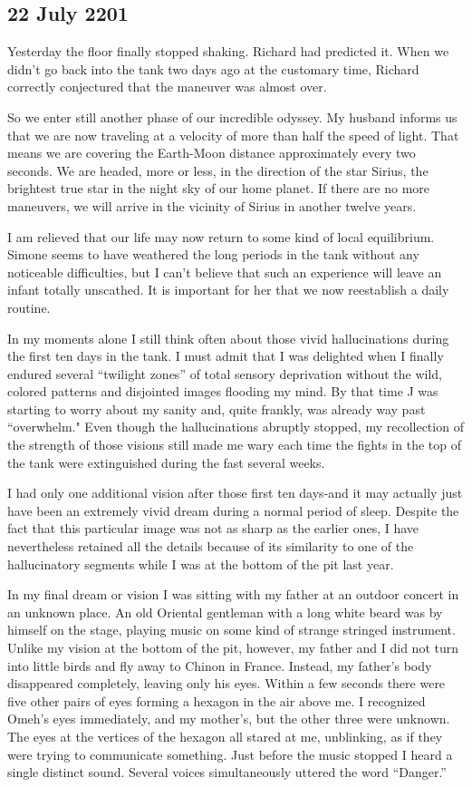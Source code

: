 \documentclass[]{article}
\begin{document}
\subsection*{22 July 2201}

Yesterday the floor finally stopped shaking.  Richard had predicted it.  When we didn’t go back into the tank two days ago at the customary time, Richard correctly conjectured that the maneuver was almost over.

So we enter still another phase of our incredible odyssey.  My husband informs us that we are now traveling at a velocity of more than half the speed of light.  That means we are covering the Earth-Moon distance approximately every two seconds.  We are headed, more or less, in the direction of the star Sirius, the brightest true star in the night sky of our home planet.  If there are no more maneuvers, we will arrive in the vicinity of Sirius in another twelve years.

I am relieved that our life may now return to some kind of local equilibrium.  Simone seems to have weathered the long periods in the tank without any noticeable difficulties, but I can’t believe that such an experience will leave an infant totally unscathed.  It is important for her that we now reestablish a daily routine.

In my moments alone I still think often about those vivid hallucinations during the first ten days in the tank.  I must admit that I was delighted when I finally endured several “twilight zones” of total sensory deprivation without the wild, colored patterns and disjointed images flooding my mind.  By that time J was starting to worry about my sanity and, quite frankly, was already way past “overwhelm."  Even though the hallucinations abruptly stopped, my recollection of the strength of those visions still made me wary each time the fights in the top of the tank were extinguished during the fast several weeks.

I had only one additional vision after those first ten days-and it may actually just have been an extremely vivid dream during a normal period of sleep.  Despite the fact that this particular image was not as sharp as the earlier ones, I have nevertheless retained all the details because of its similarity to one of the hallucinatory segments while I was at the bottom of the pit last year.

In my final dream or vision I was sitting with my father at an outdoor concert in an unknown place.  An old Oriental gentleman with a long white beard was by himself on the stage, playing music on some kind of strange stringed instrument.  Unlike my vision at the bottom of the pit, however, my father and I did not turn into little birds and fly away to Chinon in France.  Instead, my father’s body disappeared completely, leaving only his eyes.  Within a few seconds there were five other pairs of eyes forming a hexagon in the air above me.  I recognized Omeh’s eyes immediately, and my mother’s, but the other three were unknown.  The eyes at the vertices of the hexagon all stared at me, unblinking, as if they were trying to communicate something.  Just before the music stopped I heard a single distinct sound.  Several voices simultaneously uttered the word “Danger.”
\end{document}

